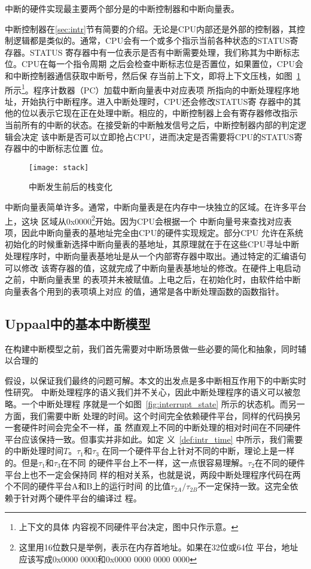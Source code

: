 中断的硬件实现最主要两个部分是的中断控制器和中断向量表。

中断控制器在\ref{sec:intr}节有简要的介绍。无论是CPU内部还是外部的控制器，其控
制逻辑都是类似的。通常，CPU会有一个或多个指示当前各种状态的STATUS寄存器。STATUS
寄存器中有一位表示是否有中断需要处理，我们称其为中断标志位。CPU在每一个指令周期
之后会检查中断标志位是否置位，如果置位，CPU会和中断控制器通信获取中断号，然后保
存当前上下文，即将上下文压栈，如图~\ref{fig:stack} 所示\footnote{上下文的具体
内容视不同硬件平台决定，图中只作示意。}。程序计数器（PC）加载中断向量表中对应表项
所指向的中断处理程序地址，开始执行中断程序。进入中断处理时，CPU还会修改STATUS寄
存器中的其他的位以表示它现在正在处理中断。相应的，中断控制器上会有寄存器修改指示
当前所有的中断的状态。在接受新的中断触发信号之后，中断控制器内部的判定逻辑会决定
该中断是否可以立即抢占CPU，进而决定是否需要将CPU的STATUS寄存器中的中断标志位置
位。

\begin{figure}[H]
	\centering
	\texttt{[image: stack]}
	\caption{中断发生前后的栈变化}
	\label{fig:stack}
\end{figure}

中断向量表简单许多。通常，中断向量表是在内存中一块独立的区域。在许多平台上，这块
区域从0x0000\footnote{这里用16位数只是举例，表示在内存首地址。如果在32位或64位
平台，地址应该写成0x0000 0000和0x0000 0000 0000 0000}开始。因为CPU会根据一个
中断向量号来查找对应表项，因此中断向量表的基地址完全由CPU的硬件实现规定。部分CPU
允许在系统初始化的时候重新选择中断向量表的基地址，其原理就在于在这些CPU寻址中断
处理程序时，中断向量表基地址是从一个内部寄存器中取出。通过特定的汇编语句可以修改
该寄存器的值，这就完成了中断向量表基地址的修改。在硬件上电启动之前，中断向量表里
的表项并未被赋值。上电之后，在初始化时，由软件给中断向量表各个用到的表项填上对应
的值，通常是各中断处理函数的函数指针。

\subsection{Uppaal中的基本中断模型}
\label{subsec:basic_uppaal}

在构建中断模型之前，我们首先需要对中断场景做一些必要的简化和抽象，同时辅以合理的

假设，以保证我们最终的问题可解。本文的出发点是多中断相互作用下的中断实时性研究。
中断处理程序的语义我们并不关心，因此中断处理程序的语义可以被忽略。一个中断处理程
序就是一个如图~\ref{fig:interrupt_state} 所示的状态机。而另一方面，我们需要中断
处理的时间。这个时间完全依赖硬件平台，同样的代码换另一套硬件时间会完全不一样，虽
然直观上不同的中断处理的相对时间在不同硬件平台应该保持一致。但事实并非如此。如定
义~\ref{def:intr_time} 中所示，我们需要的中断处理时间$T$。$\tau_1$和$\tau_3$
在同一个硬件平台上针对不同的中断，理论上是一样的。但是$\tau_1$和$\tau_3$在不同
的硬件平台上不一样，这一点很容易理解。$\tau_2$在不同的硬件平台上也不一定会保持同
样的相对关系，也就是说，两段中断处理程序代码在两个不同的硬件平台A和B上的运行时间
的比值$\tau_{2A}/\tau_{2B}$不一定保持一致。这完全依赖于针对两个硬件平台的编译过
程。

